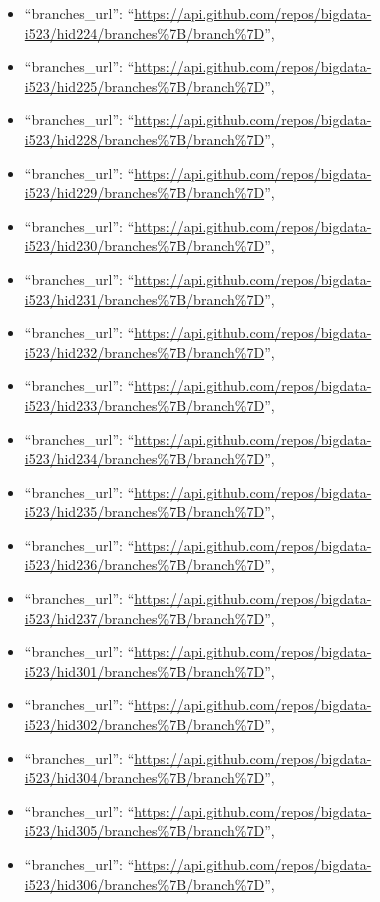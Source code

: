 \begin{itemize}
\item
  ``branches\_url'':
  ``\url{https://api.github.com/repos/bigdata-i523/hid224/branches\%7B/branch\%7D}'',
\item
  ``branches\_url'':
  ``\url{https://api.github.com/repos/bigdata-i523/hid225/branches\%7B/branch\%7D}'',
\item
  ``branches\_url'':
  ``\url{https://api.github.com/repos/bigdata-i523/hid228/branches\%7B/branch\%7D}'',
\item
  ``branches\_url'':
  ``\url{https://api.github.com/repos/bigdata-i523/hid229/branches\%7B/branch\%7D}'',
\item
  ``branches\_url'':
  ``\url{https://api.github.com/repos/bigdata-i523/hid230/branches\%7B/branch\%7D}'',
\item
  ``branches\_url'':
  ``\url{https://api.github.com/repos/bigdata-i523/hid231/branches\%7B/branch\%7D}'',
\item
  ``branches\_url'':
  ``\url{https://api.github.com/repos/bigdata-i523/hid232/branches\%7B/branch\%7D}'',
\item
  ``branches\_url'':
  ``\url{https://api.github.com/repos/bigdata-i523/hid233/branches\%7B/branch\%7D}'',
\item
  ``branches\_url'':
  ``\url{https://api.github.com/repos/bigdata-i523/hid234/branches\%7B/branch\%7D}'',
\item
  ``branches\_url'':
  ``\url{https://api.github.com/repos/bigdata-i523/hid235/branches\%7B/branch\%7D}'',
\item
  ``branches\_url'':
  ``\url{https://api.github.com/repos/bigdata-i523/hid236/branches\%7B/branch\%7D}'',
\item
  ``branches\_url'':
  ``\url{https://api.github.com/repos/bigdata-i523/hid237/branches\%7B/branch\%7D}'',
\item
  ``branches\_url'':
  ``\url{https://api.github.com/repos/bigdata-i523/hid301/branches\%7B/branch\%7D}'',
\item
  ``branches\_url'':
  ``\url{https://api.github.com/repos/bigdata-i523/hid302/branches\%7B/branch\%7D}'',
\item
  ``branches\_url'':
  ``\url{https://api.github.com/repos/bigdata-i523/hid304/branches\%7B/branch\%7D}'',
\item
  ``branches\_url'':
  ``\url{https://api.github.com/repos/bigdata-i523/hid305/branches\%7B/branch\%7D}'',
\item
  ``branches\_url'':
  ``\url{https://api.github.com/repos/bigdata-i523/hid306/branches\%7B/branch\%7D}'',

\end{itemize}

